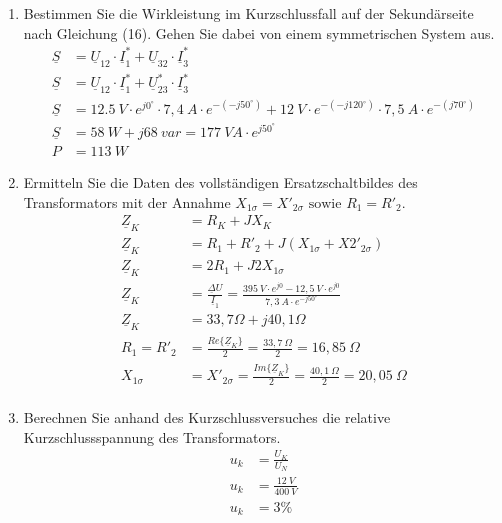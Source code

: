\begin{enumerate}[label=\alph*)]
	\item Bestimmen Sie die Wirkleistung im Kurzschlussfall auf der Sekundärseite nach
	      Gleichung (16). Gehen Sie dabei von einem symmetrischen System aus.
	      \begin{align*}
		      \underline S & = \underline U_{12} \cdot \underline I_1^* + \underline U_{32}\cdot \underline I_3^*   \\
		      \underline S & = \underline U_{12} \cdot \underline I_1^* + \underline U_{23}^*\cdot \underline I_3^* \\
		      \underline S & = 12.5\ V \cdot e^{j0^\circ} \cdot 7,4\ A \cdot e^{-(-j50^\circ)}
		      + 12\ V \cdot e^{-(-j120^\circ)}\cdot 7,5\ A \cdot e^{-(j70^\circ)}                                   \\
		      \underline S & = 58\ W+j 68\ var = 177\ VA \cdot e^{j50^\circ}                                     \\
		      P            & = 113\ W
	      \end{align*}

	\item Ermitteln Sie die Daten des vollständigen Ersatzschaltbildes des Transformators
	      mit der Annahme $X_{1\sigma} = X'_{2\sigma} \text{ sowie } R_1 = R'_2$.
	      \begin{align*}
		      \underline Z_K & = R_K + JX_{K}                                                                                 \\
		      \underline Z_K & = R_1 + R'_2 + J(X_{1\sigma} + X2'_{2\sigma})                                                  \\
		      \underline Z_K & = 2R_1 + J2X_{1\sigma}                                                                         \\
		      \underline Z_K & = \frac{\underline \Delta U}{\underline I_1} = \frac{395\ V\cdot e^{j0} - 12,5\ V\cdot e^{j0}}
		      {7,3\ A \cdot e^{-j50^\circ}}                                                                                   \\
		      \underline Z_K & = 33,7 \Omega + j40,1 \Omega                                                                   \\
		      R_1 = R'_2     & = \frac {Re\{\underline Z_K\}}{2} = \frac{33,7\ \Omega}{2} = 16,85\ \Omega                     \\
		      X_{1\sigma}    & = X'_{2\sigma} = \frac {Im\{\underline Z_K\}}{2} = \frac{40,1\ \Omega}{2} = 20,05\ \Omega      \\
	      \end{align*}

	\item Berechnen Sie anhand des Kurzschlussversuches die relative Kurzschlussspannung
	      des Transformators.
	      \begin{align*}
		      u_k & = \frac{U_K}{U_N}      \\
		      u_k & = \frac{12\ V}{400\ V} \\
		      u_k & = 3\%
	      \end{align*}

\end{enumerate}

